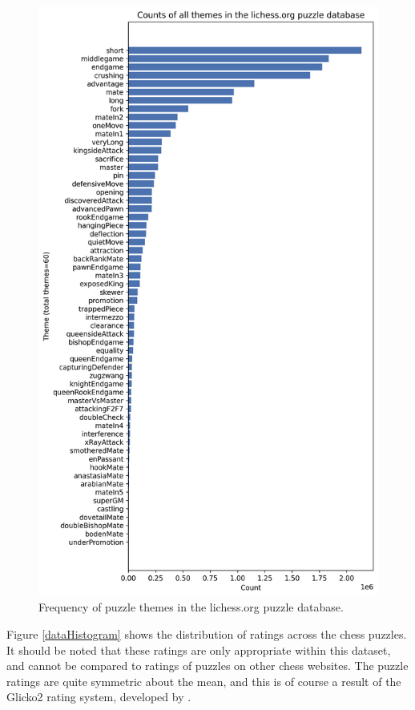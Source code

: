 \begin{figure}
    \centering
    \includegraphics[width=0.9\linewidth]{project/img/puzzle_theme_counts.png}
    \caption{Frequency of puzzle themes in the lichess.org puzzle
    database.\cite{lichessPuzzles}}
    \label{dataThemeCounts}
\end{figure}

Figure \ref{dataHistogram} shows the distribution of ratings across the chess
puzzles. It should be noted that these ratings are only appropriate within this
dataset, and cannot be compared to ratings of puzzles on other chess websites.
The puzzle ratings are quite symmetric about the mean, and this is of course a
result of the Glicko2 rating system, developed by \citet{glicko}.

